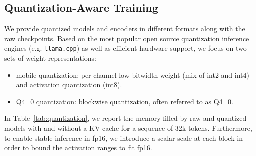 \documentclass[11pt, a4paper, logo, twocolumn, copyright]{googledeepmind}
\begin{document}
\subsection{Quantization-Aware Training}

We provide quantized models and encoders in different formats along with the raw checkpoints. 
Based on the most popular open source quantization inference engines (e.g. \texttt{llama.cpp}) as well as efficient hardware support, we focus on two sets of weight representations:
\begin{itemize}[itemsep=10pt,leftmargin=10pt,topsep=9pt]
    \item mobile quantization: per-channel low bitwidth weight (mix of int2 and int4) and activation quantization (int8).
    \item Q4\_0 quantization: blockwise quantization, often referred to as Q4\_0.
\end{itemize}
In Table~\ref{tab:quantization}, we report the memory filled by raw and quantized models with and without a KV cache for a sequence of 32k tokens.
Furthermore, to enable stable inference in fp16, we introduce a scalar scale at each block in order to bound the activation ranges to fit fp16.
\end{document}
